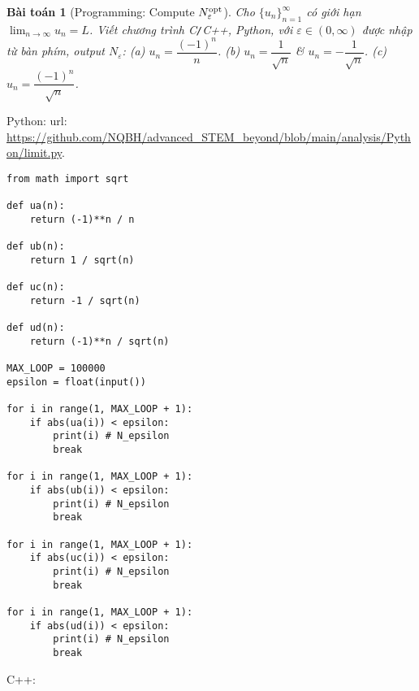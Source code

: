 \documentclass[oneside]{book}
\newtheorem{baitoan}{Bài toán}
\begin{document}
\begin{baitoan}[Programming: Compute $N_\varepsilon^{\rm opt}$]
	Cho $\{u_n\}_{n=1}^\infty$ có giới hạn $\lim_{n\to\infty} u_n = L$. Viết chương trình {\sf C{\tt/}C++, Python}, với $\varepsilon\in(0,\infty)$ được nhập từ bàn phím, output $N_\varepsilon$: (a) $u_n = \dfrac{(-1)^n}{n}$. (b) $u_n = \dfrac{1}{\sqrt{n}}$ \& $u_n = -\dfrac{1}{\sqrt{n}}$. (c) $u_n = \dfrac{(-1)^n}{\sqrt{n}}$.
\end{baitoan}
Python: {\sc url}: \url{https://github.com/NQBH/advanced_STEM_beyond/blob/main/analysis/Python/limit.py}.
\begin{verbatim}
from math import sqrt

def ua(n):
    return (-1)**n / n

def ub(n):
    return 1 / sqrt(n)

def uc(n):
    return -1 / sqrt(n)

def ud(n):
    return (-1)**n / sqrt(n)

MAX_LOOP = 100000
epsilon = float(input())

for i in range(1, MAX_LOOP + 1):
    if abs(ua(i)) < epsilon:
        print(i) # N_epsilon
        break

for i in range(1, MAX_LOOP + 1):
    if abs(ub(i)) < epsilon:
        print(i) # N_epsilon
        break

for i in range(1, MAX_LOOP + 1):
    if abs(uc(i)) < epsilon:
        print(i) # N_epsilon
        break

for i in range(1, MAX_LOOP + 1):
    if abs(ud(i)) < epsilon:
        print(i) # N_epsilon
        break
\end{verbatim}
C++:
\end{document}
